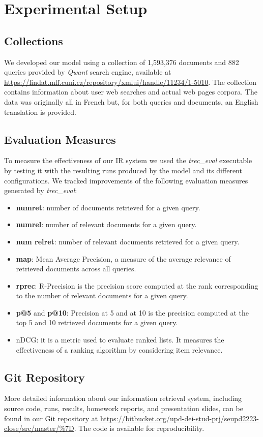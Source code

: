 \newpage
\enlargethispage{3\baselineskip}
\section{Experimental Setup}
\label{sec:setup}

\subsection{Collections}
We developed our model using a collection of 1,593,376 documents and 882 queries provided by \textit{Qwant} search engine, available at \url{https://lindat.mff.cuni.cz/repository/xmlui/handle/11234/1-5010}.
\newline
The collection contains information about user web searches and actual web pages corpora. The data was originally all in French but, for both queries and documents, an English translation is provided.


\subsection{Evaluation Measures}
To measure the effectiveness of our \ac{IR} system we used the \textit{trec\_eval} executable by testing it with the resulting runs produced by the model and its different configurations.
\newline
We tracked improvements of the following evaluation measures generated by \textit{trec\_eval}:
\begin{itemize}
	\item \textbf{num\textunderscore ret}: number of documents retrieved for a given query.
	\item \textbf{num\textunderscore rel}: number of relevant documents for a given query.
	\item \textbf{num \textunderscore rel\textunderscore ret}: number of relevant documents retrieved for a given query.
    \item \textbf{map}: Mean Average Precision, a measure of the average relevance of retrieved documents across all queries. 
    \item \textbf{rprec}: R-Precision is the precision score computed at the rank corresponding to the number of relevant documents for a given query.
    \item \textbf{p@5} and \textbf{p@10}: Precision at 5 and at 10 is the precision computed at the top 5 and 10 retrieved documents for a given query.
    \item{nDCG}: it is a metric used to evaluate ranked lists. It measures the effectiveness of a ranking algorithm by considering item relevance.
\end{itemize}


\subsection{Git Repository}
More detailed information about our information retrieval system, including source code, runs, results, homework reports, and presentation slides, can be found in our Git repository at \url{https://bitbucket.org/upd-dei-stud-prj/seupd2223-close/src/master/%7D}. 
The code is available for reproducibility.